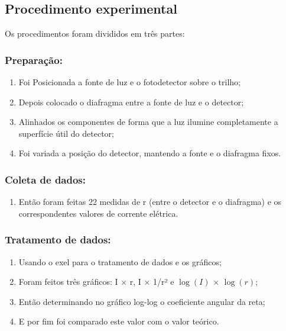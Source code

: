 \documentclass [a4paper, 12pt]{article}
\begin{document}
\subsection{Procedimento experimental}
Os procedimentos foram divididos em três partes:

\subsubsection{Preparação:}

\begin{enumerate}
    \item  Foi Posicionada a fonte de luz e o fotodetector sobre o trilho;
    \item Depois colocado o diafragma entre a fonte de luz e o detector;
    \item Alinhados os componentes de forma que a luz ilumine completamente a superfície útil do detector;
    \item Foi variada a posição do detector, mantendo a fonte e o diafragma fixos.
\end{enumerate}

\subsubsection{Coleta de dados:}


\begin{enumerate} 
\item Então foram feitas 22 medidas de r (entre o detector e o diafragma) e os correspondentes valores de corrente elétrica.
\end{enumerate}


\subsubsection{Tratamento de dados:}

\begin{enumerate} 
\item Usando o exel para o tratamento de dados e os gráficos;

\item Foram feitos três gráficos: I $\times$ r, I $\times$ 1/r² e $\log(I)$ $\times$ $\log(r)$;

\item Então determinando no gráfico log-log o coeficiente angular da reta;

\item E por fim foi comparado este valor com o valor teórico.

\end{enumerate}
\end{document}
